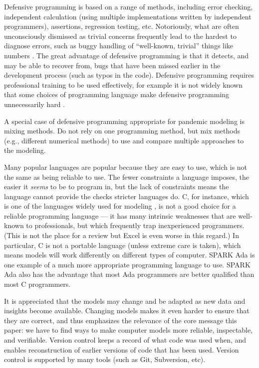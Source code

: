 \documentclass{article}
\begin{document}
 Defensive programming is based on a range of methods, including error checking, independent calculation (using multiple implementations written by independent programmers), assertions, regression testing, etc. Notoriously, what are often unconsciously dismissed as trivial concerns frequently lead to the hardest to diagnose errors, such as buggy handling of ``well-known, trivial'' things like numbers \cite{numerals}. The great advantage of defensive programming is that it detects, and may be able to recover from, bugs that have been missed earlier in the development process (such as typos in the code). Defensive programming requires professional training to be used effectively, for example it is not widely known that some choices of programming language make defensive programming unnecessarily hard \cite{heedless}.

A special case of defensive programming appropriate for pandemic modeling is mixing methods. Do not rely on one programming method, but mix methods (e.g., different numerical methods) to use and compare multiple approaches to the modeling.

Many popular languages are popular because they are easy to use, which is not the same as being reliable to use. The fewer constraints a language imposes, the easier it \emph{seems\/} to be to program in, but the lack of constraints means the language cannot provide the checks stricter languages do. C, for instance, which is one of the languages widely used for modeling \cite{tweet,plos}, is not a good choice for a reliable programming language --- it has many intrinsic weaknesses that are well-known to professionals, but which frequently trap inexperienced programmers. (This is not the place for a review \cite{heedless} but Excel is even worse in this regard.) In particular, C is not a portable language (unless extreme care is taken), which means models will work differently on different types of computer. SPARK Ada is one example of a much more appropriate programming language to use. SPARK Ada also has the advantage that most Ada programmers are better qualified than most C programmers.

It is appreciated that the models may change and be adapted as new data and insights become available. Changing models makes it even harder to ensure that they are correct, and thus emphasizes the relevance of the core message this paper: we have to find ways to make computer models more reliable, inspectable, and verifiable. Version control keeps a record of what code was used when, and enables reconstruction of earlier versions of code that has been used. Version control is supported by many tools (such as Git, Subversion, etc). 
\end{document}
